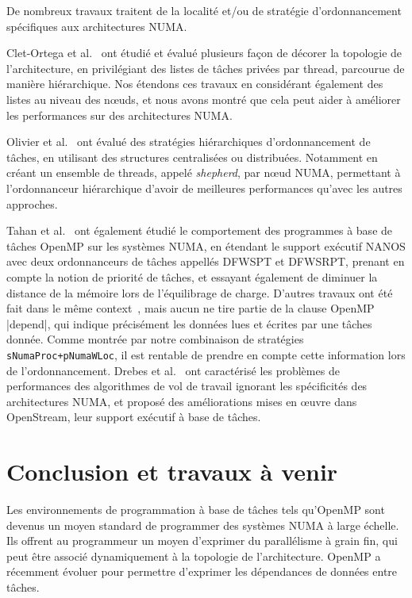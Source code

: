 \documentclass[parallelisme]{compas2016}
\begin{document}
De nombreux travaux traitent de la localité et/ou de stratégie d'ordonnancement
spécifiques aux architectures NUMA.

Clet-Ortega et al.~\cite{DBLP:conf/europar/Clet-OrtegaCP14} ont étudié et évalué plusieurs
façon de décorer la topologie de l'architecture, en privilégiant des listes de tâches
privées par thread, parcourue de manière hiérarchique. Nos étendons ces travaux
en considérant également des listes au niveau des nœuds, et nous avons montré
que cela peut aider à améliorer les performances sur des architectures NUMA.

Olivier et al.~\cite{DBLP:journals/ijhpca/OlivierPWSP12} ont évalué des stratégies
hiérarchiques d'ordonnancement de tâches, en utilisant des structures centralisées
ou distribuées. Notamment en créant un ensemble de threads, appelé \emph{shepherd}, par
nœud NUMA, permettant à l'ordonnanceur hiérarchique d'avoir de meilleures performances
qu'avec les autres approches.

Tahan et al.~\cite{DBLP:journals/corr/Tahan14} ont également étudié le comportement
des programmes à base de tâches OpenMP sur les systèmes NUMA, en étendant le
support exécutif NANOS avec deux ordonnanceurs de tâches appellés DFWSPT et DFWSRPT,
prenant en compte la notion de priorité de tâches, et essayant également de diminuer
la distance de la mémoire lors de l'équilibrage de charge.
D'autres travaux ont été fait dans le même context~\cite{DBLP:conf/europar/TerbovenSCM12,DBLP:journals/corr/abs-1101-0093},
mais aucun ne tire partie de la clause OpenMP |depend|, qui indique précisément les
données lues et écrites par une tâches donnée. Comme montrée par notre combinaison
de stratégies \verb/sNumaProc+pNumaWLoc/, il est rentable de prendre en compte
cette information lors de l'ordonnancement.
Drebes et al.~\cite{LIP610333} ont caractérisé les problèmes de performances des
algorithmes de vol de travail ignorant les spécificités des architectures NUMA,
et proposé des améliorations mises en œuvre dans OpenStream, leur support exécutif à base de tâches.


\section{Conclusion et travaux à venir}

Les environnements de programmation à base de tâches tels qu'OpenMP sont devenus
un moyen standard de programmer des systèmes NUMA à large échelle.
Ils offrent au programmeur un moyen d'exprimer du parallélisme à grain fin,
qui peut être associé dynamiquement à la topologie de l'architecture.
OpenMP a récemment évoluer pour permettre d'exprimer les dépendances de données
entre tâches.
\end{document}
